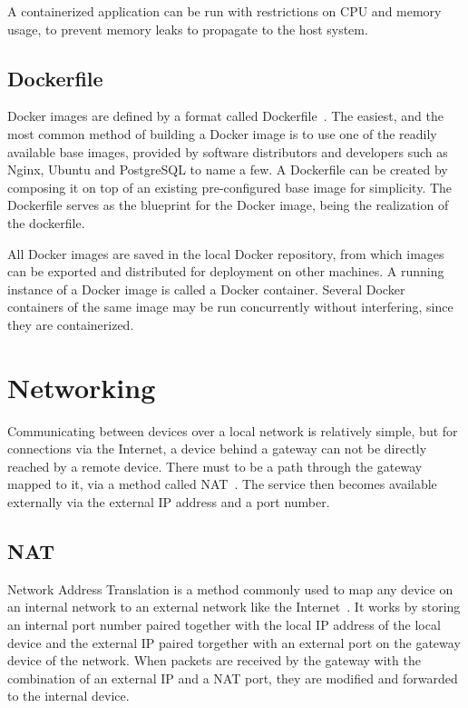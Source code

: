 A containerized application can be run with restrictions on CPU and memory usage, to prevent memory leaks to propagate to the host system.

\subsection{Dockerfile}
Docker images are defined by a format called Dockerfile~\cite{docker-dockerfile}. The easiest, and the most common method of building a Docker image is to use one of the readily available base images, provided by software distributors and developers such as Nginx, Ubuntu and PostgreSQL to name a few. A Dockerfile can be created by composing it on top of an existing pre-configured base image for simplicity. The Dockerfile serves as the blueprint for the Docker image, being the realization of the dockerfile.

All Docker images are saved in the local Docker repository, from which images can be exported and distributed for deployment on other machines. A running instance of a Docker image is called a Docker container. Several Docker containers of the same image may be run concurrently without interfering, since they are containerized.

\section{Networking}
Communicating between devices over a local network is relatively simple, but for connections via the Internet, a device behind a gateway can not be directly reached by a remote device. There must to be a path through the gateway mapped to it, via a method called NAT~\cite{kurose:p349}. The service then becomes available externally via the external IP address and a port number. 

\subsection{NAT}
Network Address Translation is a method commonly used to map any device on an internal network to an external network like the Internet~\cite{kurose:p349}. It works by storing an internal port number paired together with the local IP address of the local device and the external IP paired torgether with an external port on the gateway device of the network. When packets are received by the gateway with the combination of an external IP and a NAT port, they are modified and forwarded to the internal device.

